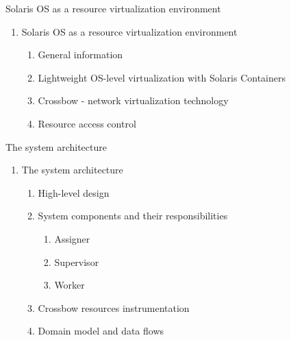 \documentclass{beamer}
\begin{document}
\setcounter{enumi_chapter}{\value{enumi}}


\begin{frame}{Solaris OS as a resource virtualization environment}

	\begin{enumerate}
		\setcounter{enumi}{\value{enumi_chapter}}

		\item Solaris OS as a resource virtualization environment

			\begin{enumerate}
				\item General information
				\item Lightweight OS-level virtualization with Solaris Containers
				\item Crossbow - network virtualization technology
				\item Resource access control
			\end{enumerate}

	\end{enumerate}

\end{frame}

\setcounter{enumi_chapter}{\value{enumi}}


\begin{frame}{The system architecture}

	\begin{enumerate}
		\setcounter{enumi}{\value{enumi_chapter}}

		\item The system architecture

		\begin{enumerate}
			\item High-level design \pause
			\item System components and their responsibilities

				\begin{enumerate}
					\item Assigner
					\item Supervisor
					\item Worker
				\end{enumerate}

				\pause
			
			\item Crossbow resources instrumentation \pause
			\item Domain model and data flows
		\end{enumerate}

	\end{enumerate}

\end{frame}
\end{document}
